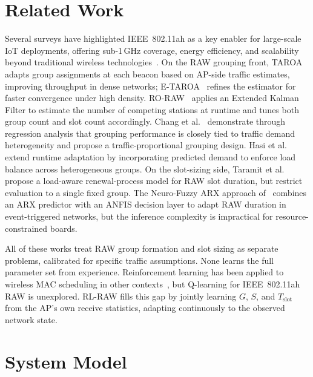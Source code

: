 \documentclass[conference]{IEEEtran}
\begin{document}
\section{Related Work}

Several surveys have highlighted IEEE~802.11ah as a key enabler for
large-scale IoT deployments, offering sub-1\,GHz coverage, energy efficiency,
and scalability beyond traditional wireless technologies~\cite{tian2021survey,
ahmed2021mac}.
On the RAW grouping front, TAROA~\cite{tian2016taroa} adapts group assignments
at each beacon based on AP-side traffic estimates, improving throughput in
dense networks; E-TAROA~\cite{tian2017etaroa} refines the estimator for
faster convergence under high density.
RO-RAW~\cite{liu2020roraw} applies an Extended Kalman Filter to estimate
the number of competing stations at runtime and tunes both group count and
slot count accordingly.
Chang et al.~\cite{chang2019traffic} demonstrate through regression analysis
that grouping performance is closely tied to traffic demand heterogeneity and
propose a traffic-proportional grouping design.
Hasi et al.~\cite{hasi2022} extend runtime adaptation by incorporating
predicted demand to enforce load balance across heterogeneous groups.
On the slot-sizing side, Taramit et al.~\cite{taramit2023laca} propose a
load-aware renewal-process model for RAW slot duration, but restrict
evaluation to a single fixed group.
The Neuro-Fuzzy ARX approach of~\cite{nandhini2025} combines an ARX predictor
with an ANFIS decision layer to adapt RAW duration in event-triggered networks,
but the inference complexity is impractical for resource-constrained boards.

All of these works treat RAW group formation and slot sizing as separate
problems, calibrated for specific traffic assumptions.
None learns the full parameter set from experience.
Reinforcement learning has been applied to wireless MAC scheduling in other
contexts~\cite{mnih2015,sutton2018}, but Q-learning for IEEE~802.11ah RAW
is unexplored.
RL-RAW fills this gap by jointly learning $G$, $S$, and $T_\text{slot}$
from the AP's own receive statistics, adapting continuously to the observed
network state.

\section{System Model}
\end{document}

